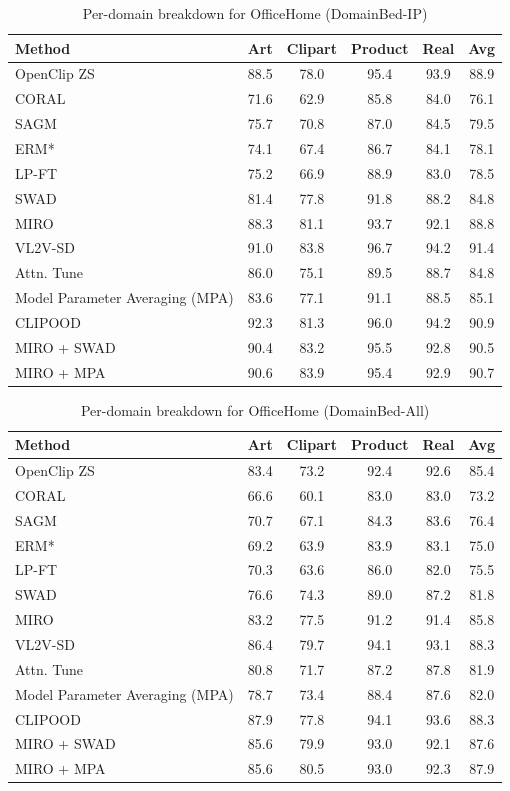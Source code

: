 \documentclass{article} %
\begin{document}
\begin{table}[t]
\small
\centering
\caption{Per-domain breakdown for OfficeHome (DomainBed-IP)}
\begin{tabular}{lccccc}
\toprule
\textbf{Method} & Art & Clipart & Product & Real & Avg \\ \midrule
OpenClip ZS & 88.5 & 78.0 & 95.4 & 93.9 & 88.9\\
\midrule
CORAL & 71.6 & 62.9 & 85.8 & 84.0 & 76.1 \\ 
SAGM & 75.7 & 70.8 & 87.0 & 84.5 & 79.5 \\
ERM* & 74.1 & 67.4 & 86.7 & 84.1 & 78.1 \\ 
LP-FT & 75.2 & 66.9 & 88.9 & 83.0 & 78.5 \\ 
SWAD & 81.4 & 77.8 & 91.8 & 88.2 & 84.8 \\ 
MIRO & 88.3 & 81.1 & 93.7 & 92.1 & 88.8 \\ 
VL2V-SD & 91.0 & 83.8 & 96.7 & 94.2 & 91.4 \\ 
Attn. Tune & 86.0 & 75.1 & 89.5 & 88.7 & 84.8 \\ 
Model Parameter Averaging (MPA) & 83.6 & 77.1 & 91.1 & 88.5 & 85.1 \\ 
CLIPOOD~\citep{shu2023clipood} & 92.3  & 81.3  & 96.0   & 94.2   & 90.9 \\\hline
MIRO + SWAD & 90.4 & 83.2 & 95.5 & 92.8 & 90.5 \\ 
MIRO + MPA & 90.6 & 83.9 & 95.4 & 92.9 & 90.7 \\ 
\bottomrule
\end{tabular}
\label{table:OfficeHome_IP}
\end{table}

\begin{table}[t]
\small
\centering
\caption{Per-domain breakdown for OfficeHome (DomainBed-All)}
\begin{tabular}{lccccc}
\toprule
\textbf{Method} & Art & Clipart & Product & Real & Avg \\ \midrule
OpenClip ZS & 83.4 & 73.2 & 92.4 & 92.6 & 85.4 \\
\midrule
CORAL & 66.6 & 60.1 & 83.0 & 83.0 & 73.2 \\ 
SAGM & 70.7 & 67.1 & 84.3 & 83.6 & 76.4 \\ 
ERM* & 69.2 & 63.9 & 83.9 & 83.1 & 75.0 \\ 
LP-FT & 70.3 & 63.6 & 86.0 & 82.0 & 75.5 \\ 
SWAD & 76.6 & 74.3 & 89.0 & 87.2 & 81.8 \\ 
MIRO & 83.2 & 77.5 & 91.2 & 91.4 & 85.8 \\ 
VL2V-SD & 86.4 & 79.7 & 94.1 & 93.1 & 88.3 \\ 
Attn. Tune & 80.8 & 71.7 & 87.2 & 87.8 & 81.9 \\ 
Model Parameter Averaging (MPA) & 78.7 & 73.4 & 88.4 & 87.6 & 82.0 \\  
CLIPOOD &  87.9  & 77.8 &  94.1   & 93.6  & 88.3 \\\hline
MIRO + SWAD & 85.6 & 79.9 & 93.0 & 92.1 & 87.6 \\ 
MIRO + MPA & 85.6 & 80.5 & 93.0 & 92.3 & 87.9 \\ 
\bottomrule
\end{tabular}
\label{table:OfficeHome_overall}
\end{table}
\end{document}
